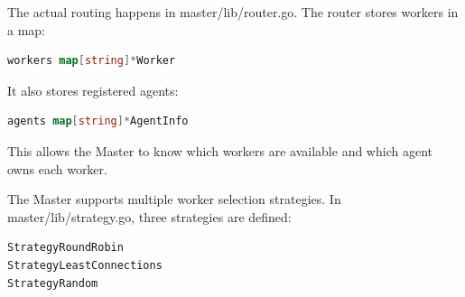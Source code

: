 The actual routing happens in master/lib/router.go. The router stores workers in a map:

\begin{lstlisting}[language=Go]
workers map[string]*Worker
\end{lstlisting}

It also stores registered agents:

\begin{lstlisting}[language=Go]
agents map[string]*AgentInfo
\end{lstlisting}

This allows the Master to know which workers are available and which agent owns each worker.

The Master supports multiple worker selection strategies. In master/lib/strategy.go, three strategies are defined:

\begin{lstlisting}[language=Go]
StrategyRoundRobin
StrategyLeastConnections
StrategyRandom
\end{lstlisting}
